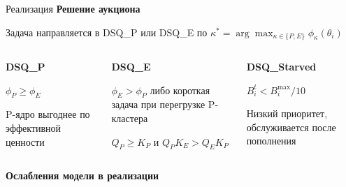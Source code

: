 \documentclass[aspectratio=169,11pt]{beamer}
\begin{document}
\begin{frame}{Реализация}
        \footnotesize
        \textbf{Решение аукциона}

        Задача направляется в DSQ\_P или DSQ\_E по
        $\kappa^* = \arg\max_{\kappa\in\{P,E\}} \phi_\kappa(\theta_i)$

        \vspace{0.3em}
        \begin{columns}[T]
                \begin{shadowbox2}
                        \textbf{DSQ\_P}

                        \vspace{0.2em}
                        \footnotesize
                        $\phi_P \geq \phi_E$

                        \vspace{0.1em}
                        P-ядро выгоднее по эффективной ценности
                \end{shadowbox2}

                \begin{shadowbox2}
                        \textbf{DSQ\_E}

                        \vspace{0.2em}
                        \footnotesize
                        $\phi_E > \phi_P$ либо короткая задача
                        при перегрузке P-кластера

                        \vspace{0.1em}
                        {\scriptsize $Q_P \geq K_P$ и $Q_P K_E > Q_E K_P$}
                \end{shadowbox2}

                \begin{shadowbox2}
                        \textbf{DSQ\_Starved}

                        \vspace{0.2em}
                        \footnotesize
                        $B_i^t < B_i^{\max} / 10$

                        \vspace{0.1em}
                        Низкий приоритет, обслуживается после пополнения
                \end{shadowbox2}
        \end{columns}

        \vspace{0.6em}
        \footnotesize\textbf{Ослабления модели в реализации}


\end{frame}
\end{document}
